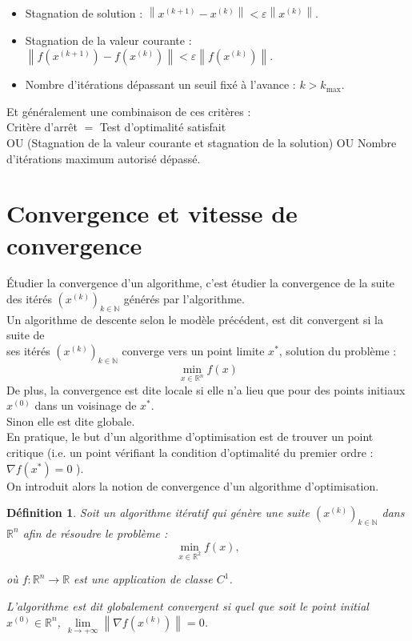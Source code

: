 \documentclass[12pt,a4paper,openay]{book}
\newtheorem{Def}{D\'efinition}[chapter]
\numberwithin{equation}{chapter}
\newcommand{\N}{\mathbb{N}}
\newcommand{\R}{\mathbb{R}}
\begin{document}
	\begin{itemize}
		\item[$\bullet$] Stagnation de solution : $\left\|x^{(k+1)}-x^{(k)}\right\|<\varepsilon\left\|x^{(k)}\right\|$.
		\item[$\bullet$] Stagnation de la valeur courante : $\left\|f\left(x^{(k+1)}\right)-f\left(x^{(k)}\right)\right\|<\varepsilon\left\|f\left(x^{(k)}\right)\right\|$.
		\item[$\bullet$] Nombre d'it\'erations d\'epassant un seuil fix\'e \`a l'avance : $k>k_{\max }$.
	\end{itemize}	
	Et g\'en\'eralement une combinaison de ces crit\`eres :\\	
	Crit\`ere d'arr\^et $=$ Test d'optimalit\'e satisfait\\	
	OU (Stagnation de la valeur courante et stagnation de la solution) OU Nombre d'it\'erations maximum autoris\'e d\'epass\'e.
	
	
	\section{Convergence et vitesse de convergence}
	
	Étudier la convergence d'un algorithme, c'est \'etudier la convergence de la suite des it\'er\'es $\left(x^{(k)}\right)_{k \in \N}$ g\'en\'er\'es par l'algorithme.\\	
	Un algorithme de descente selon le mod\`ele pr\'ec\'edent, est dit convergent si la suite de\\	
	ses it\'er\'es $\left(x^{(k)}\right)_{k \in \N}$ converge vers un point limite $x^{*}$, solution du probl\`eme :	
	$$
	\min_{x \in \R^{n}} f(x)
	$$	
	De plus, la convergence est dite locale si elle n'a lieu que pour des points initiaux $x^{(0)}$ dans un voisinage de $x^{*}$.\\	
	Sinon elle est dite globale.\\	
	En pratique, le but d'un algorithme d'optimisation est de trouver un point critique (i.e. un point v\'erifiant la condition d'optimalit\'e du premier ordre : $\nabla f\left(x^{*}\right)=0$ ).\\	
	On introduit alors la notion de convergence d'un algorithme d'optimisation.	
	\begin{Def}			
		Soit un algorithme it\'eratif qui g\'en\`ere une suite $\left(x^{(k)}\right)_{k \in \N}$ dans $\R^{n}$ afin de r\'esoudre le probl\`eme :			
		$$
		\min_{x \in \R^{2}} f(x),
		$$
			
		o\`u $f: \R^{n} \to \R$ est une application de classe $C^{1}$.
		
		L'algorithme est dit globalement convergent si quel que soit le point initial $x^{(0)} \in \R^{n}$, $\lim\limits_{k \to+\infty}\left\|\nabla f\left(x^{(k)}\right)\right\|=0$.
	\end{Def}
	
\end{document}
